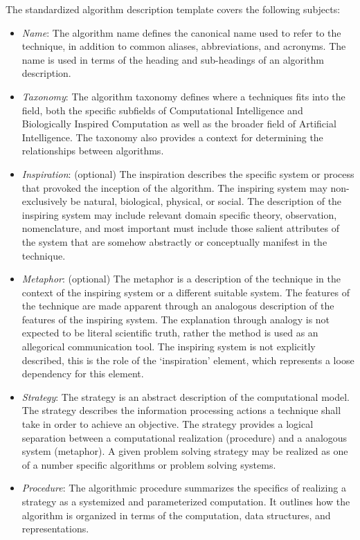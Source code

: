 The standardized algorithm description template covers the following subjects:
\begin{itemize}
	\item \emph{Name}: The algorithm name defines the canonical name used to refer to the technique, in addition to common aliases, abbreviations, and acronyms. The name is used in terms of the heading and sub-headings of an algorithm description.
	\item \emph{Taxonomy}: The algorithm taxonomy defines where a techniques fits into the field, both the specific subfields of Computational Intelligence and Biologically Inspired Computation as well as the broader field of Artificial Intelligence. The taxonomy also provides a context for determining the relationships between algorithms.
	\item \emph{Inspiration}: (optional) The inspiration describes the specific system or process that provoked the inception of the algorithm. The inspiring system may non-exclusively be natural, biological, physical, or social. The description of the inspiring system may include relevant domain specific theory, observation, nomenclature, and most important must include those salient attributes of the system that are somehow abstractly or conceptually manifest in the technique.
	\item \emph{Metaphor}: (optional) The metaphor is a description of the technique in the context of the inspiring system or a different suitable system. The features of the technique are made apparent through an analogous description of the features of the inspiring system. The explanation through analogy is not expected to be literal scientific truth, rather the method is used as an allegorical communication tool. The inspiring system is not explicitly described, this is the role of the `inspiration' element, which represents a loose dependency for this element.
	\item \emph{Strategy}: The strategy is an abstract description of the computational model. The strategy describes the information processing actions a technique shall take in order to achieve an objective. The strategy provides a logical separation between a computational realization (procedure) and a analogous system (metaphor). A given problem solving strategy may be realized as one of a number specific algorithms or problem solving systems.
	\item \emph{Procedure}: The algorithmic procedure summarizes the specifics of realizing a strategy as a systemized and parameterized computation. It outlines how the algorithm is organized in terms of the computation, data structures, and representations. 

\end{itemize}
